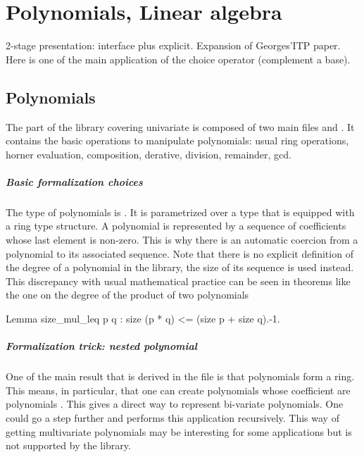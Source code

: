 \chapter{Polynomials, Linear algebra}

2-stage presentation: interface plus explicit. Expansion of
Georges'ITP paper. Here is one of the main application of the choice
operator (complement a base).


\section{Polynomials}

The part of the library covering univariate is composed of two main files
 and . It contains the basic operations to manipulate
polynomials: usual ring operations, horner evaluation, composition, derative, division, remainder, gcd.

\paragraph{Basic formalization choices} 
The type of polynomials is . It is parametrized over a type 
that is equipped with a ring type structure.
A polynomial is represented by a sequence of coefficients whose last element is non-zero.
This is why there is an automatic coercion from a polynomial to its associated sequence.
Note that there is no explicit definition of the degree of a polynomial in the library, 
the size of  its sequence is used instead. This discrepancy with usual mathematical practice can
be seen in theorems like the one on the degree of the product of two 
polynomials 

\begin{coq}{}{}
Lemma size_mul_leq p q : size (p * q) <= (size p + size q).-1.
\end{coq}
\paragraph{Formalization trick: nested polynomial}
One of the  main result that is derived in the file  is that polynomials
form a ring. This means, in particular, that one can create polynomials 
whose coefficient are polynomials . This gives a direct way to 
represent bi-variate polynomials. One could go a step further and performs this application
recursively.
This way of getting multivariate polynomials may be interesting for some applications
but is not supported by the library.

